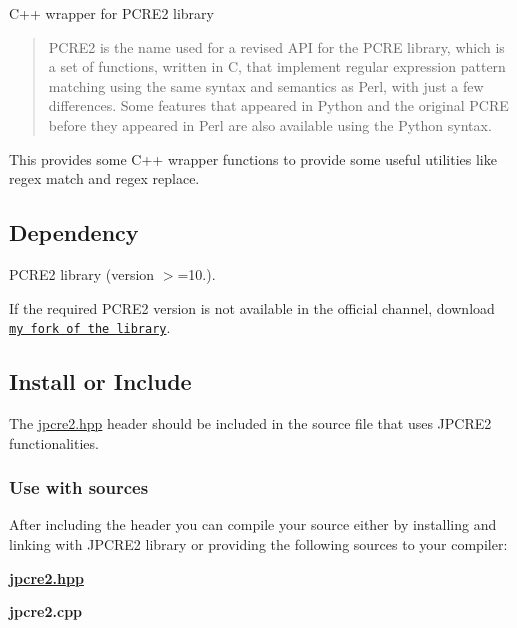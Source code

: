 C++ wrapper for P\+C\+R\+E2 library

\href{https://travis-ci.org/jpcre2/jpcre2/}{\tt } \href{http://docs.neurobin.org/jpcre2/index.html}{\tt } \href{https://isocpp.org/}{\tt } \href{http://www.regular-expressions.info/pcre2.html}{\tt } \href{ftp://ftp.csx.cam.ac.uk/pub/software/programming/pcre/}{\tt }

\begin{quote}
P\+C\+R\+E2 is the name used for a revised A\+PI for the P\+C\+RE library, which is a set of functions, written in C, that implement regular expression pattern matching using the same syntax and semantics as Perl, with just a few differences. Some features that appeared in Python and the original P\+C\+RE before they appeared in Perl are also available using the Python syntax. \end{quote}


This provides some C++ wrapper functions to provide some useful utilities like regex match and regex replace.\hypertarget{index_dependency}{}\subsection{Dependency}\label{index_dependency}

\begin{DoxyEnumerate}
\item P\+C\+R\+E2 library ({\ttfamily version $>$=10.}).
\end{DoxyEnumerate}

If the required P\+C\+R\+E2 version is not available in the official channel, download \href{https://github.com/jpcre2/pcre2}{\tt my fork of the library}.\hypertarget{index_install-or-include}{}\subsection{Install or Include}\label{index_install-or-include}
The {\ttfamily \hyperlink{jpcre2_8hpp}{jpcre2.\+hpp}} header should be included in the source file that uses J\+P\+C\+R\+E2 functionalities.\hypertarget{index_use-with-sources}{}\subsubsection{Use with sources}\label{index_use-with-sources}
After including the header you can compile your source either by installing and linking with J\+P\+C\+R\+E2 library or providing the following sources to your compiler\+:


\begin{DoxyEnumerate}
\item {\bfseries \hyperlink{jpcre2_8hpp}{jpcre2.\+hpp}}
\item {\bfseries jpcre2.\+cpp}
\end{DoxyEnumerate}

